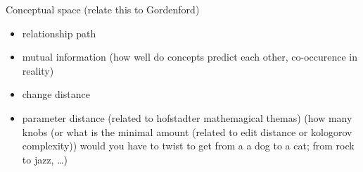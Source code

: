 









Conceptual space (relate this to Gordenford)
\begin{itemize}
    \item relationship path 
    \item mutual information (how well do concepts predict each other, co-occurence in reality)
    \item change distance
    \item parameter distance (related to hofstadter mathemagical themas) (how many knobs (or what is the minimal amount (related to edit distance or kologorov complexity)) would you have to twist to get from a a dog to a cat; from rock to jazz, \dots)
\end{itemize}

